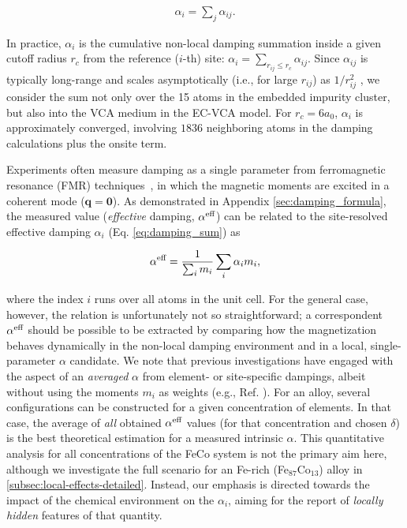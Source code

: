 \begin{equation}\label{eq:damping_sum}
\begin{split}
\alpha_i =\sum_j \alpha_{ij}.
\end{split}
\end{equation}

In practice, $\alpha_i$ is the cumulative non-local damping summation inside a given cutoff radius $r_c$ from the reference ($i$-th) site: $\alpha_i=\sum_{r_{ij}\leq r_c}\alpha_{ij}$. Since $\alpha_{ij}$ is typically long-range and scales asymptotically (i.e., for large $r_{ij}$) as $1/r_{ij}^2$ \cite{PhysRevMaterials.2.013801,PhysRevB.108.014433,PhysRevB.109.094417}, we consider the sum not only over the 15 atoms in the embedded impurity cluster, but also into the VCA medium in the EC-VCA model. For $r_c=6a_0$, $\alpha_i$ is approximately converged, involving $1836$ neighboring atoms in the damping calculations plus the onsite term. 

Experiments often measure damping as a single parameter from ferromagnetic resonance (FMR) techniques~\cite{ma2017metrology,Schoen2016}, in which the magnetic moments are excited in a coherent mode ($\mathbf{q}=\mathbf{0}$). As demonstrated in Appendix \ref{sec:damping_formula}, the measured value (\textit{effective} damping, $\alpha^{\textnormal{eff}}$) can be related to the site-resolved effective damping $\alpha_i$ (Eq. \ref{eq:damping_sum}) as

\begin{equation}
\label{eq:total-damping}
\alpha^{\textnormal{eff}}=\frac{1}{\sum_i m_i}\sum_i \alpha_im_i,
\end{equation}

\noindent where the index $i$ runs over all atoms in the unit cell. For the general case, however, the relation is unfortunately not so straightforward; a correspondent $\alpha^{\textnormal{eff}}$ should be possible to be extracted by comparing how the magnetization behaves dynamically in the non-local damping environment and in a local, single-parameter $\alpha$ candidate. We note that previous investigations have engaged with the aspect of an \textit{averaged} $\alpha$ from element- or site-specific dampings, albeit  
without using the moments $m_i$ as weights (e.g., Ref. \cite{PhysRevB.95.214417}). For an alloy, several configurations can be constructed for a given concentration of elements. In that case, the average of \textit{all} obtained $\alpha^{\textnormal{eff}}$ values (for that concentration and chosen $\delta$) is the best theoretical estimation for a measured intrinsic $\alpha$. This quantitative analysis for all concentrations of the FeCo system is not the primary aim here, although we investigate the full scenario for an Fe-rich (Fe$_{87}$Co$_{13}$) alloy in \ref{subsec:local-effects-detailed}. Instead, our emphasis is directed towards the impact of the chemical environment on the $\alpha_i$, aiming for the report of \textit{locally hidden} features of that quantity.

